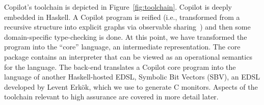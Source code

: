 Copilot's toolchain is depicted in Figure~\ref{fig:toolchain}.  Copilot is deeply embedded in Haskell.  A Copilot program is
reified (i.e., transformed from a recursive structure into explicit graphs via
observable sharing~\cite{gill}) and then some domain-specific type-checking is
done.  At this point, we have transformed the program into the ``core''
language, an intermediate representation.  The core package contains
an  interpreter  that can be viewed as an operational semantics for
the language.   The back-end translates a Copilot core program into the language of another
Haskell-hosted EDSL, 
Symbolic Bit Vectors (SBV),  an EDSL developed by Levent Erk\"{o}k, which we use to generate C
monitors.  Aspects of the toolchain relevant to high assurance are covered in more
detail later.




